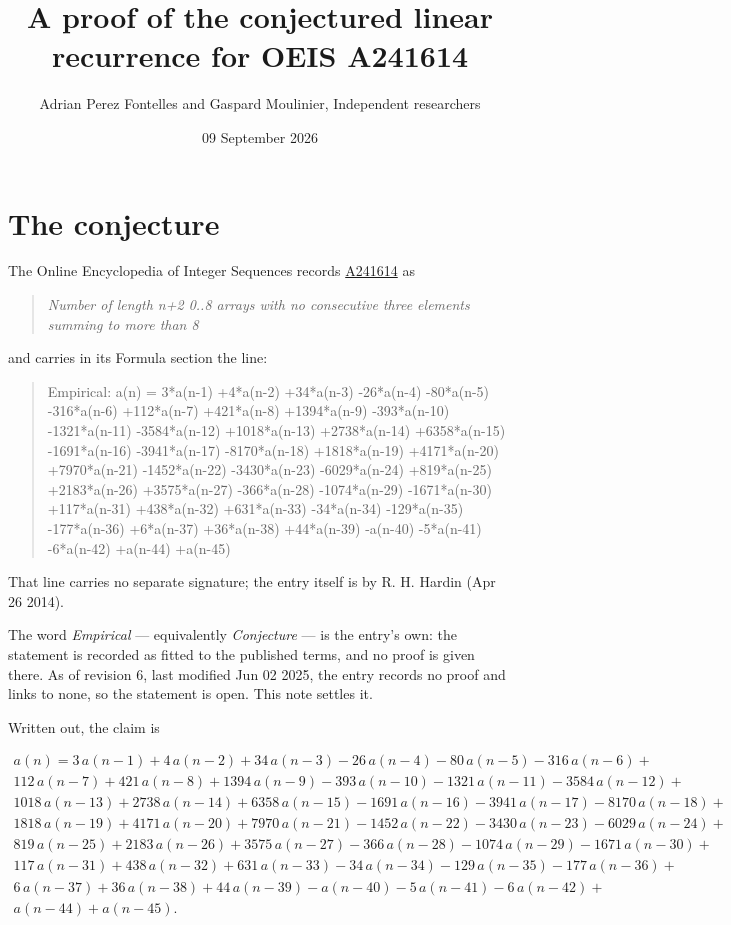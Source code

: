 \documentclass[11pt]{article}
\title{A proof of the conjectured linear recurrence for OEIS A241614}
\author{Adrian Perez Fontelles and Gaspard Moulinier, Independent researchers}
\date{09 September 2026}
\theoremstyle{definition}
\begin{document}
\maketitle
\section{The conjecture}

The Online Encyclopedia of Integer Sequences records \href{https://oeis.org/A241614}{A241614} as

\begin{quote}\itshape Number of length n+2 0..8 arrays with no consecutive three elements summing to more than 8\end{quote}

and carries in its Formula section the line:

\begin{quote}\ttfamily Empirical: a(n) = 3*a(n-1) +4*a(n-2) +34*a(n-3) -26*a(n-4) -80*a(n-5) -316*a(n-6) +112*a(n-7) +421*a(n-8) +1394*a(n-9) -393*a(n-10) -1321*a(n-11) -3584*a(n-12) +1018*a(n-13) +2738*a(n-14) +6358*a(n-15) -1691*a(n-16) -3941*a(n-17) -8170*a(n-18) +1818*a(n-19) +4171*a(n-20) +7970*a(n-21) -1452*a(n-22) -3430*a(n-23) -6029*a(n-24) +819*a(n-25) +2183*a(n-26) +3575*a(n-27) -366*a(n-28) -1074*a(n-29) -1671*a(n-30) +117*a(n-31) +438*a(n-32) +631*a(n-33) -34*a(n-34) -129*a(n-35) -177*a(n-36) +6*a(n-37) +36*a(n-38) +44*a(n-39) -a(n-40) -5*a(n-41) -6*a(n-42) +a(n-44) +a(n-45)\end{quote}

That line carries no separate signature; the entry itself is by R. H. Hardin (Apr 26 2014).

The word {\itshape Empirical} --- equivalently {\itshape Conjecture} --- is the entry's own: the statement is recorded as fitted to the published terms, and no proof is given there. As of revision 6, last modified Jun 02 2025, the entry records no proof and links to none, so the statement is open. This note settles it.

Written out, the claim is

\begin{multline*} a(n) = 3\,a(n-1) + 4\,a(n-2) + 34\,a(n-3) - 26\,a(n-4) - 80\,a(n-5) - 316\,a(n-6) + \\ 112\,a(n-7) + 421\,a(n-8) + 1394\,a(n-9) - 393\,a(n-10) - 1321\,a(n-11) - 3584\,a(n-12) + \\ 1018\,a(n-13) + 2738\,a(n-14) + 6358\,a(n-15) - 1691\,a(n-16) - 3941\,a(n-17) - 8170\,a(n-18) + \\ 1818\,a(n-19) + 4171\,a(n-20) + 7970\,a(n-21) - 1452\,a(n-22) - 3430\,a(n-23) - 6029\,a(n-24) + \\ 819\,a(n-25) + 2183\,a(n-26) + 3575\,a(n-27) - 366\,a(n-28) - 1074\,a(n-29) - 1671\,a(n-30) + \\ 117\,a(n-31) + 438\,a(n-32) + 631\,a(n-33) - 34\,a(n-34) - 129\,a(n-35) - 177\,a(n-36) + \\ 6\,a(n-37) + 36\,a(n-38) + 44\,a(n-39) - a(n-40) - 5\,a(n-41) - 6\,a(n-42) + \\ a(n-44) + a(n-45). \end{multline*}
\end{document}
